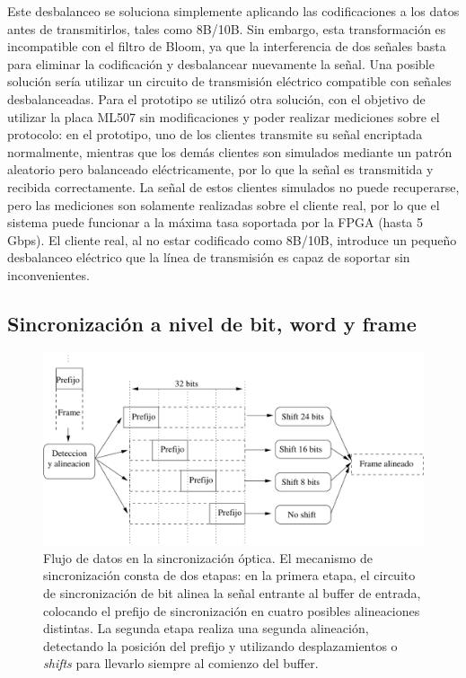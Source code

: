 Este desbalanceo se soluciona simplemente aplicando las codificaciones a los datos antes de transmitirlos, tales como 8B/10B. Sin embargo, esta transformación es incompatible con el filtro de Bloom, ya que la interferencia de dos señales basta para eliminar la codificación y desbalancear nuevamente la señal. Una posible solución sería utilizar un circuito de transmisión eléctrico compatible con señales desbalanceadas. Para el prototipo se utilizó otra solución, con el objetivo de utilizar la placa ML507 sin modificaciones y poder realizar mediciones sobre el protocolo: en el prototipo, uno de los clientes transmite su señal encriptada normalmente, mientras que los demás clientes son simulados mediante un patrón aleatorio pero balanceado eléctricamente, por lo que la señal es transmitida y recibida correctamente. La señal de estos clientes simulados no puede recuperarse, pero las mediciones son solamente realizadas sobre el cliente real, por lo que el sistema puede funcionar a la máxima tasa soportada por la FPGA (hasta 5 Gbps). El cliente real, al no estar codificado como 8B/10B, introduce un pequeño desbalanceo eléctrico que la línea de transmisión es capaz de soportar sin inconvenientes.

\subsection{Sincronización a nivel de bit, word y frame}
\label{fpga:sync}
\begin{figure}[t]
  \centering
    \includegraphics[width=6.2in]{graphs/optsync.pdf}
\caption {Flujo de datos en la sincronización óptica. El mecanismo de sincronización consta de dos etapas: en la primera etapa, el circuito de sincronización de bit alinea la señal entrante al buffer de entrada, colocando el prefijo de sincronización en cuatro posibles alineaciones distintas. La segunda etapa realiza una segunda alineación, detectando la posición del prefijo y utilizando desplazamientos o \textit{shifts} para llevarlo siempre al comienzo del buffer.}
\label{fig:optsync}
\end{figure}



